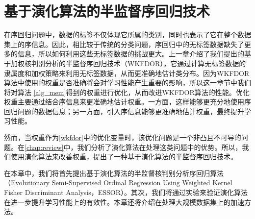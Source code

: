 \chapter{基于演化算法的半监督序回归技术}
\label{chap:essor}
在序回归问题中，数据的标签不仅体现它所属的类别，同时也表示了它在整个数据集上的序信息。因此，相比较于传统的分类问题，序回归中的无标签数据缺失了更多的信息，所以如何利用这些无标签数据的挑战更大。上一章介绍了我们提出的基于加权核判别分析的半监督序回归技术（WKFDOR），它通过计算无标签数据的隶属度和加权策略来利用无标签数据，从而更准确地估计类分布。因为WKFDOR算法中使用的权重是否准确将会对学习性能产生重要的影响，所以这一章节中我们将对算法 \ref{alg_mem}得到的权重进行优化，从而改进WKFDOR算法的性能。优化权重主要通过结合序信息来更准确地估计权重。一方面，这样能够更充分地使用序回归问题的数据信息；另一方面，引入序信息能够更准确地估计权重，最终提升学习性能。

然而，当权重作为\autoref{wkfdor}中的优化变量时，该优化问题是一个非凸且不可导的问题。在\autoref{chap:review}中，我们分析了演化算法在处理这类问题中的优势。所以，我们使用演化算法来改善权重，提出了一种基于演化算法的半监督序回归技术。

在本章中，我们将首先提出基于演化算法的半监督核判别分析序回归算法（Evolutionary Semi-Supervised Ordinal Regression Using Weighted Kernel Fisher Discriminant Analysis，ESSOR）。其次，我们将通过实验来验证演化算法在进一步提升学习性能上的有效性。本章还将介绍在处理大规模数据集上的加速方法。


